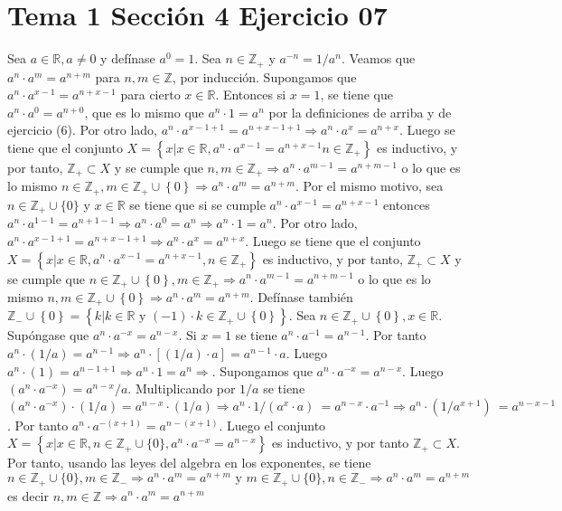 \documentclass{article}
\begin{document}
\section{Tema 1 Sección 4 Ejercicio 07}
Sea \(a\in \mathbb{R}, a\neq 0\) y  defínase \(a^0=1\). Sea \(n\in \mathbb{Z}_{+} \text{ y } a^{-n}=1/a^{n}\). Veamos que \( a^n \cdot a^m =a^{n + m}\) para \(n,m\in \mathbb{Z}\), por inducción. Supongamos que \( a^n \cdot a^{x-1} =a^{n + x-1}\) para cierto \(x\in \mathbb{R}\). Entonces si \(x=1\), se tiene que  \( a^n \cdot a^{0} =a^{n + 0}\), que es lo mismo que \(a^n \cdot 1 =a^{n}\) por la definiciones de arriba y de ejercicio (6).
 Por otro lado, \( a^n \cdot a^{x-1+1} =a^{n + x-1 +1}\Rightarrow  a^n \cdot a^{x} =a^{n + x} \). Luego se tiene que el conjunto \(X=\left\{x|x\in\mathbb{R},a^n \cdot a^{x-1} =a^{n + x-1} n\in\mathbb{Z}_{+}\right\}\) es inductivo, y por tanto,
 \(\mathbb{Z}_{+}\subset X\) y se cumple que \(n,m\in\mathbb{Z}_{+}\Rightarrow a^n \cdot a^{m-1} =a^{n + m-1}\) o lo que es lo mismo \(n\in\mathbb{Z}_{+}, m\in\mathbb{Z}_{+}\cup\left\{0\right\}\Rightarrow a^n \cdot a^{m} =a^{n + m}\).
 Por el mismo motivo, sea \(n\in \mathbb{Z}_{+}\cup\{0\}\) y \(x\in\mathbb{R}\) se tiene que si se cumple \( a^n \cdot a^{x-1} =a^{n + x-1}\) entonces \( a^n \cdot a^{1-1} =a^{n + 1-1}\Rightarrow  a^n \cdot a^{0} =a^{n}\Rightarrow  a^n \cdot 1 =a^{n}\).
 Por otro lado,  \( a^n \cdot a^{x-1+1} =a^{n + x-1 +1}\Rightarrow  a^n \cdot a^{x} =a^{n + x} \).
 Luego se tiene que el conjunto \(X=\left\{x|x\in\mathbb{R},a^n \cdot a^{x-1} =a^{n + x-1}, n\in\mathbb{Z}_{+}\right\}\) es inductivo, y por tanto, \(\mathbb{Z}_{+}\subset X\) y se cumple que \(n\in\mathbb{Z}_{+}\cup\left\{0\right\},m\in\mathbb{Z}_{+}\Rightarrow a^n \cdot a^{m-1} =a^{n + m-1}\) o lo que es lo mismo \(n,m \in\mathbb{Z}_{+}\cup\left\{0\right\}\Rightarrow a^n \cdot a^{m} =a^{n + m}\).
 Defínase también \(\mathbb{Z}_{-}\cup\left\{0\right\}=\left\{k|k\in \mathbb{R}\text{ y }\left(-1\right)\cdot k\in \mathbb{Z}_{+}\cup \left\{0\right\}\right\}\). Sea \(n\in\mathbb{Z}_{+}\cup\left\{0\right\}, x\in\mathbb{R}\). Supóngase que \(a^n \cdot a^{-x} =a^{n-x}\).
 Si \(x=1\) se tiene \(a^n \cdot  a^{-1} =a^{n-1}\). Por tanto \(a^n \cdot \left(1/a\right)=a^{n-1}\Rightarrow a^n \cdot \left[\left(1/a\right)\cdot a\right]=a^{n-1}\cdot a\). Luego \(a^n \cdot \left(1\right)=a^{n-1+1}\Rightarrow a^n \cdot 1=a^{n}\Rightarrow\).  Supongamos que \(a^n \cdot a^{-x} =a^{n-x}\). Luego \(\left(a^n \cdot a^{-x}\right) =a^{n-x}/a\). Multiplicando por \(1/a\) se tiene\(\left(a^n \cdot a^{-x}\right)\cdot\left(1/a\right) =a^{n-x}\cdot\left(1/a\right)\Rightarrow a^n \cdot 1/\left(a^x \cdot a\right)\ =a^{n-x}\cdot a^{-1}\Rightarrow a^n \cdot \left(1/a^{x+1} \right)\ =a^{n-x-1}\). Por tanto \(a^n \cdot a^{-\left(x+1\right)}=a^{n-\left(x+1\right)}\). Luego el conjunto \(X=\left\{x|x\in \mathbb{R},n\in\mathbb{Z}_{+}\cup\{0\}, a^n \cdot a^{-x} =a^{n-x}\right\}\) es inductivo, y por tanto \(\mathbb{Z}_{+}\subset X\). Por tanto, usando las leyes del algebra en los exponentes, se tiene \(n\in\mathbb{Z}_{+}\cup\{0\},m\in\mathbb{Z}_{-}\Rightarrow a^n \cdot a^{m} =a^{n+m}\text{ y }m\in\mathbb{Z}_{+}\cup\{0\},n\in\mathbb{Z}_{-}\Rightarrow a^n \cdot a^{m} =a^{n+m}\) es decir \(n,m\in\mathbb{Z}\Rightarrow a^n \cdot a^{m} =a^{n+m}\)
\end{document}
